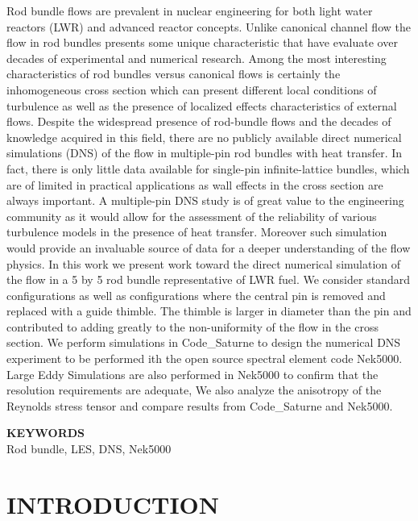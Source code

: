 \documentclass[11pt,letterpaper,english]{article}
\begin{document}
Rod bundle flows are prevalent in nuclear engineering for both light water reactors (LWR) and advanced reactor concepts. Unlike canonical channel flow the flow in rod bundles presents some unique characteristic that have evaluate over decades of  experimental and numerical research. Among the most interesting characteristics of rod bundles versus canonical flows is certainly the inhomogeneous cross section which can present different local conditions of turbulence as well as the presence of localized effects characteristics of external flows.
Despite the widespread presence of rod-bundle flows and the decades of knowledge acquired in this field, there are no publicly available direct numerical simulations (DNS) of the flow in multiple-pin rod bundles with heat transfer. In fact, there is only little data available for single-pin infinite-lattice bundles, which are of limited in practical applications as wall effects in the cross section are always important. A multiple-pin DNS study is of great value to the engineering community  as it would allow for the assessment of the reliability of various turbulence models in the presence of heat transfer. Moreover such simulation would provide an invaluable source of data for a deeper understanding of the flow physics.
In this work we present work toward the direct numerical simulation of the flow in a 5 by 5 rod bundle representative of LWR fuel. We consider standard configurations as well as configurations where the central pin is removed and replaced with a guide thimble. The thimble is larger in diameter than the pin and contributed to adding greatly to the non-uniformity of the flow in the cross section. We perform simulations in Code\_Saturne to design the numerical DNS experiment to be performed ith the open source spectral element code Nek5000. Large Eddy Simulations are also performed in Nek5000 to confirm that the resolution requirements are adequate,   We also analyze the anisotropy of the Reynolds stress tensor and compare results from Code\_Saturne and Nek5000.

\begin{flushright}
{\bf KEYWORDS} \\
Rod bundle, LES, DNS, Nek5000
\end{flushright}

\section{INTRODUCTION}
\end{document}
